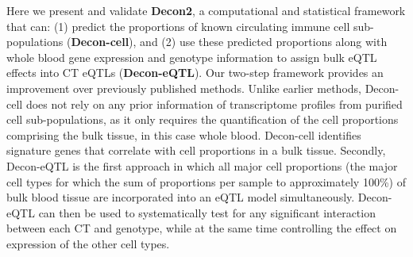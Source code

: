 Here we present and validate \textbf{Decon2}, a computational and statistical framework that can: (1) predict the proportions of known circulating immune cell sub-populations (\textbf{Decon-cell}), and (2) use these predicted proportions along with whole blood gene expression and genotype information to assign bulk eQTL effects into CT eQTLs (\textbf{Decon-eQTL}). Our two-step framework provides an improvement over previously published methods. Unlike earlier methods\cite{aranXCellDigitallyPortraying2017}, Decon-cell does not rely on any prior information of transcriptome profiles from purified cell sub-populations, as it only requires the quantification of the cell proportions comprising the bulk tissue, in this case whole blood. Decon-cell identifies  signature genes that correlate with cell proportions in a bulk tissue. Secondly, Decon-eQTL is the first approach in which all major cell proportions (the major cell types for which the sum of proportions per sample to approximately 100\%) of bulk blood tissue are incorporated into an eQTL model simultaneously. Decon-eQTL can then be used to systematically test for any significant interaction between each CT and genotype, while at the same time controlling the effect on expression of the other cell types.

